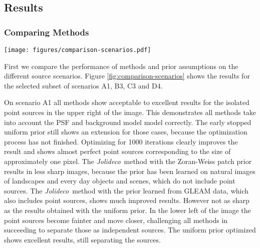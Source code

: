 \documentclass[twocolumn]{aastex631}
\DeclareMathOperator{\arcsinh}{arcsinh}
\newcommand{\jolideco}{\textit{Jolideco}~}
\begin{document}
    \subsection{Results}
    \subsubsection{Comparing Methods}
    \begin{figure*}
        \begin{centering}
            \texttt{[image: figures/comparison-scenarios.pdf]}
            \caption{
                Comparison of different deconvolution methods and prior assumptions for different selected source scenarios, as described in Section~\ref{subsec:test-datasets}. The simulation of the data for this figure used a fixed background level of $\lambda_{Bkg} = \qty[mode = math]{0.01}{cts/pix}$, a uniform exposure and a Gaussian PSF of width $\sigma_{PSF} = \qty[mode = math]{2}{pix}$, corresponding to the \enquote{Chandra} instrument scenario. The leftmost column shows the simulated counts data and the second most column from the left the underlying ground truth to compare. The other columns show the reconstructed flux by the different methods and prior assumptions for \jolideco. To enhance weak structures the images use an $\arcsinh$ stretching with a scale parameter of $a=0.02$. The stretching is the same for all images. The methods are described in detail in Section~\ref{subsec:methods}. A more detailed representation of the results is available at \url{https://jolideco.github.io/jolideco-comparison}.
            }
            \label{fig:comparison-scenarios}
        \end{centering}
    \end{figure*}
    First we compare the performance of methods and prior assumptions on the different source scenarios. Figure \ref{fig:comparison-scenarios} shows the results for the selected subset of scenarios A1, B3, C3 and D4. 
    
    On scenario A1 all methods show acceptable to excellent results for the isolated point sources in the upper right of the image. This demonstrates all methods take into account the PSF and background model model correctly. The early stopped uniform prior still shows an extension for those cases, because the optimization process has not finished. Optimizing for 1000 iterations clearly improves the result and shows almost perfect point sources corresponding to the size of approximately one pixel. The \jolideco method with the Zoran-Weiss patch prior results in less sharp images, because the prior has been learned on natural images of landscapes and every day objects and scenes, which do not include point sources. The \jolideco method with the prior learned from GLEAM data, which also includes point sources, shows much improved results. However not as sharp as the results obtained with the uniform prior. In the lower left of the image the point sources become fainter and move closer, challenging all methods in succeeding to separate those as independent sources. The uniform prior optimized  shows excellent results, still separating the sources. 
    
\end{document}
